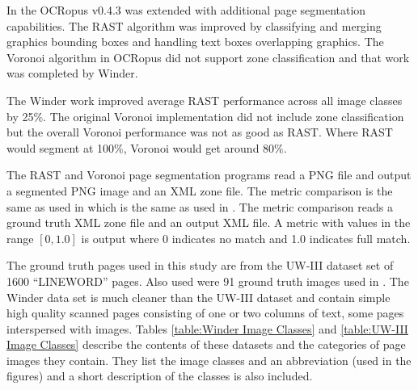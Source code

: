 \documentclass[conference]{IEEEtran}
\begin{document}


In \cite{winder2010extending} the OCRopus v0.4.3 was extended with
additional page segmentation capabilities. The RAST algorithm was improved by
classifying and merging graphics bounding boxes and handling text boxes
overlapping graphics.  The Voronoi algorithm in OCRopus did not support zone
classification and that work was completed by Winder.

The Winder work improved average RAST performance across all image classes by
25\%. The original Voronoi implementation did not include zone classification
but the overall Voronoi performance was not as good as RAST. Where RAST would
segment at 100\%, Voronoi would get around 80\%.


The RAST and Voronoi page segmentation programs read a PNG file and output a
segmented PNG image and an XML zone file. The metric comparison is the same as
used in \cite{winder2010extending} which is the same as used in
\cite{phillips1999empirical}\cite{antonacopoulos2007page}. The metric comparison
reads a ground truth XML zone file and an output XML file. A metric with values
in the range $[0, 1.0]$ is output where 0 indicates no match and 1.0 indicates
full match. 

The ground truth pages used in this study are from the UW-III dataset set of
1600 “LINEWORD” pages. Also used were 91 ground truth images used in \cite{winder2010extending}.
The Winder data set is much cleaner than the UW-III dataset
and contain simple high quality scanned pages consisting of one or two
columns of text, some pages interspersed with images. Tables \ref{table:Winder Image Classes} 
and \ref{table:UW-III Image Classes} describe the contents of these datasets
and the categories of page images they contain.  They list the image classes 
and an abbreviation (used in the figures) and a short description of the
classes is also included.
\end{document}
